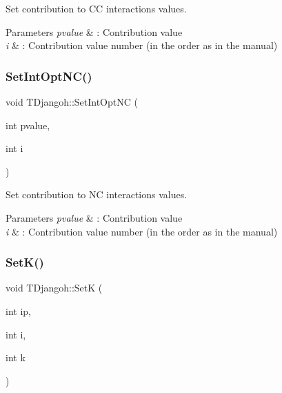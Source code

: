 Set contribution to CC interactions values. 


\begin{DoxyParams}{Parameters}
{\em pvalue} & \+: Contribution value \\
\hline
{\em i} & \+: Contribution value number (in the order as in the manual) \\
\hline
\end{DoxyParams}
\mbox{\label{class_t_djangoh_a867c7f0d6deb79773b4529e496a2ee23}} 
\subsubsection{\texorpdfstring{Set\+Int\+Opt\+N\+C()}{SetIntOptNC()}}
{\footnotesize\ttfamily void T\+Djangoh\+::\+Set\+Int\+Opt\+NC (\begin{DoxyParamCaption}\item[{int}]{pvalue,  }\item[{int}]{i }\end{DoxyParamCaption})}



Set contribution to NC interactions values. 


\begin{DoxyParams}{Parameters}
{\em pvalue} & \+: Contribution value \\
\hline
{\em i} & \+: Contribution value number (in the order as in the manual) \\
\hline
\end{DoxyParams}
\mbox{\label{class_t_djangoh_a045a7fabe350589453e240bff98ca54b}} 
\subsubsection{\texorpdfstring{Set\+K()}{SetK()}}
{\footnotesize\ttfamily void T\+Djangoh\+::\+SetK (\begin{DoxyParamCaption}\item[{int}]{ip,  }\item[{int}]{i,  }\item[{int}]{k }\end{DoxyParamCaption})\hspace{0.3cm}{\ttfamily [inline]}}



